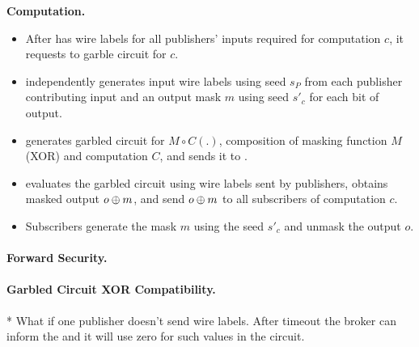 \noindent\textbf{Computation.}
\begin{itemize}[leftmargin=*]

  \item After \broker has wire labels for all publishers' inputs required for
	computation $c$, it requests \garbler to garble circuit for $c$.  
  
  \item \garbler independently generates input wire labels using seed $s_P$
	from each publisher contributing input and an output mask $m$ using seed
	$s'_c$ for each bit of output.

  \item \garbler generates garbled circuit for $M \circ C(.)$, composition of
	masking function $M$ (XOR) and computation $C$, and sends it to \broker.

  \item \broker evaluates the garbled circuit using wire labels sent by
	publishers, obtains masked output $o \oplus m$, and send $o \oplus m$ to all
	subscribers of computation $c$.
  
  \item Subscribers generate the mask $m$ using the seed $s'_c$ and unmask the
	output $o$.

\end{itemize}


\paragraph{Forward Security.}

\paragraph{Garbled Circuit XOR Compatibility.}


* What if one publisher doesn't send wire labels. After timeout the broker can inform the \garbler and it will use zero for such values in the circuit.
